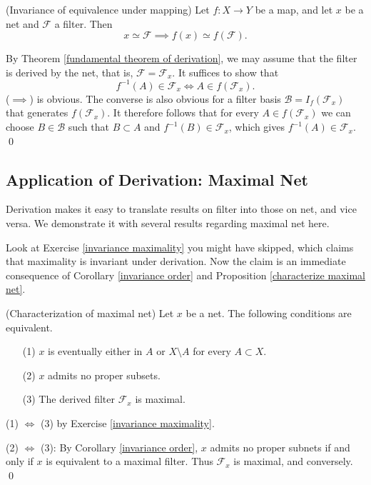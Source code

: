 \documentclass{report}
\begin{document}
\begin{prp}\label{invariance under mapping} (Invariance of equivalence under mapping)
    Let \( f:X \to Y \) be a map, and let \( x \) be a net and \( \mathscr{F} \) a filter. Then
    \[
        x \simeq \mathscr{F} \implies f(x)\simeq f(\mathscr{F}).
    \]
\end{prp}
\begin{prf}
    By Theorem \ref{fundamental theorem of derivation}, we may assume that the filter is derived by the net, that is, \( \mathscr{F} = \mathscr{F}_x \).
    It suffices to show that
    \begin{equation*}
        f^{-1}(A)\in \mathscr{F}_x \iff A \in f(\mathscr{F}_x).
    \end{equation*}
    (\( \implies \)) is obvious. The converse is also obvious for a filter basis \( \mathscr{B}=I_f(\mathscr{F}_x) \) that generates \( f(\mathscr{F}_x) \). It therefore follows that for every \( A \in f(\mathscr{F}_x)\) we can choose \( B \in \mathscr{B} \) such that \( B \subset A \) and \( f^{-1}(B) \in \mathscr{F}_x \), which gives \( f^{-1}(A) \in \mathscr{F}_x \).
    \qed\end{prf}


\subsection{Application of Derivation: Maximal Net} \label{maximal net}

Derivation makes it easy to translate results on filter into those on net, and vice versa. We demonstrate it with several results regarding maximal net here.

\begin{rem} \label{invariance of maximality is obvious}
    Look at Exercise \ref{invariance maximality} you might have skipped, which claims that maximality is invariant under derivation. Now the claim is an immediate consequence of Corollary \ref{invariance order} and Proposition \ref{characterize maximal net}.
\end{rem}

\begin{thm}\label{characterize maximal net} (Characterization of maximal net)
    Let \( x \) be a net. The following conditions are equivalent.
    \begin{itemize}
        \item[(1)] \( x \) is eventually either in \( A \) or \( X \setminus A \) for every \( A \subset X \).
        \item[(2)] \( x \) admits no proper subsets.
        \item[(3)] The derived filter \( \mathscr{F}_x \) is maximal.
    \end{itemize}
\end{thm}
\begin{prf}
    (1) \( \iff  \) (3) by Exercise \ref{invariance maximality}.

    (2) \( \iff  \) (3): By Corollary \ref{invariance order}, \( x \) admits no proper subnets if and only if \( x \) is equivalent to a maximal filter.
    Thus \( \mathscr{F}_x \) is maximal, and conversely.
    \qed\end{prf}
\end{document}
